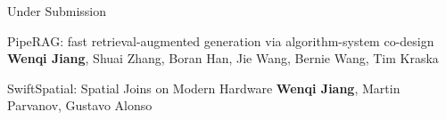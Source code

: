 

\begin{rSection}{Under Submission}
\begin{enumerate}[label={[\arabic*]}]

\item 
\begin{Pub}{PipeRAG: fast retrieval-augmented generation via algorithm-system co-design}
{\textbf{Wenqi Jiang}, Shuai Zhang, Boran Han, Jie Wang, Bernie Wang, Tim Kraska}
{}
\end{Pub}

\item 
\begin{Pub}{SwiftSpatial: Spatial Joins on Modern Hardware}
{\textbf{Wenqi Jiang}, Martin Parvanov, Gustavo Alonso}
{}
\end{Pub}\end{enumerate}
\end{rSection}




